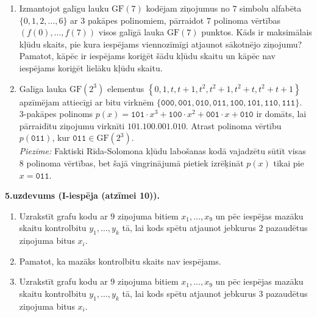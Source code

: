 \documentclass[a4paper,12pt]{article}
\begin{document}
\begin{enumerate}[label=(\alph*)]
\item Izmantojot galīgu lauku $\text{GF}(7)$ kodējam ziņojumus no 
$7$ simbolu alfabēta $\{ 0,1,2,\ldots,6 \}$ ar $3$ pakāpes polinomiem, 
pārraidot $7$ polinoma vērtības $(f(0),\ldots,f(7))$ visos
galīgā lauka $\text{GF}(7)$ punktos. 
Kāds ir maksimālais kļūdu skaits, pie kura iespējams 
viennozīmīgi atjaunot sākotnējo ziņojumu?
Pamatot, kāpēc ir iespējams koriģēt šādu kļūdu skaitu un kāpēc nav
iespējams koriģēt lielāku kļūdu skaitu.
\item Galīga lauka $\text{GF}(2^3)$ elementus $\left\{ 0,1,t,t+1,t^2,t^2+1,t^2+t,t^2+t+1 \right\}$
apzīmējam attiecīgi ar bitu virknēm $\{\mathtt{000},\mathtt{001},\mathtt{010},\mathtt{011},
\mathtt{100},\mathtt{101},\mathtt{110},\mathtt{111}\}$.\\
$3$-pakāpes polinoms $p(x) = \mathtt{101}\cdot{}x^3 + \mathtt{100}\cdot{}x^2 + \mathtt{001}\cdot{}x + \mathtt{010}$
ir domāts, lai pārraidītu ziņojumu virknīti $\mathtt{101.100.001.010}$. 
Atrast polinoma vērtību $p(\mathtt{011})$, kur $\mathtt{011}\in\text{GF}(2^3)$.\\
{\em Piezīme:} Faktiski Rīda-Solomona kļūdu labošanas kodā vajadzētu sūtīt 
visas $8$ polinoma vērtības, bet šajā vingrinājumā pietiek izrēķināt $p(x)$ tikai pie $x=\mathtt{011}$. 
\end{enumerate}




\vspace{10pt}
{\bf 5.uzdevums (I-iespēja (atzīmei 10)).}

\begin{enumerate}[label=(\alph*)]
\item Uzrakstīt grafu kodu ar $9$ ziņojuma bitiem $x_1,\ldots,x_{9}$ 
un pēc iespējas mazāku skaitu kontrolbitu $y_1,\ldots,y_k$ tā, 
lai kods spētu atjaunot jebkurus $2$ pazaudētus ziņojuma bitus $x_i$.
\item Pamatot, ka mazāks kontrolbitu skaits nav iespējams.
\item Uzrakstīt grafu kodu ar $9$ ziņojuma bitiem $x_1,\ldots,x_{9}$ 
un pēc iespējas mazāku skaitu kontrolbitu $y_1,\ldots,y_k$ tā, 
lai kods spētu atjaunot jebkurus $3$ pazaudētus ziņojuma bitus $x_i$.
\end{enumerate}
\end{document}
